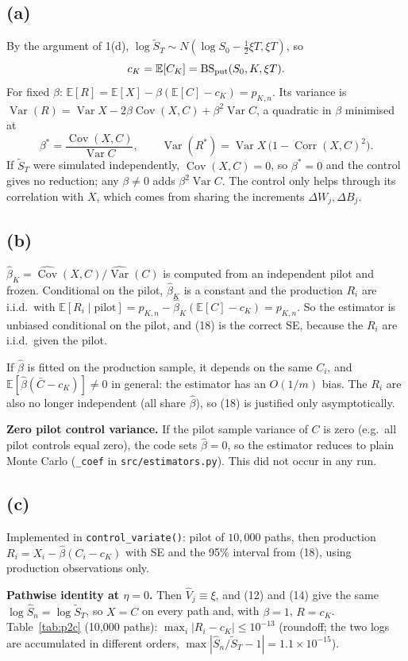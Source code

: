 \documentclass[10pt]{article}
\newcommand{\E}{\mathbb{E}}
\newcommand{\Var}{\operatorname{Var}}
\newcommand{\Cov}{\operatorname{Cov}}
\newcommand{\Corr}{\operatorname{Corr}}
\newcommand{\Vh}{\widehat V}
\newcommand{\Sh}{\widehat S}
\newcommand{\R}{../results}
\begin{document}
\subsection*{(a)}
By the argument of 1(d), $\log\widetilde S_T\sim N(\log S_0-\tfrac12\xi T,\xi T)$, so
\[
c_K=\E[C_K]=\mathrm{BS}_{\rm put}(S_0,K,\xi T).
\]
For fixed $\beta$: $\E[R]=\E[X]-\beta(\E[C]-c_K)=p_{K,n}$. Its variance is
$\Var(R)=\Var X-2\beta\Cov(X,C)+\beta^2\Var C$, a quadratic in $\beta$ minimised at
\[
\beta^*=\frac{\Cov(X,C)}{\Var C},\qquad \Var(R^*)=\Var X\,\big(1-\Corr(X,C)^2\big).
\]
If $\widetilde S_T$ were simulated independently, $\Cov(X,C)=0$, so $\beta^*=0$ and the control gives
no reduction; any $\beta\ne0$ adds $\beta^2\Var C$. The control only helps through its
correlation with $X$, which comes from sharing the increments $\Delta W_j,\Delta B_j$.

\subsection*{(b)}
$\hat\beta_K=\widehat{\Cov}(X,C)/\widehat{\Var}(C)$ is computed from an independent pilot and frozen.
Conditional on the pilot, $\hat\beta_K$ is a constant and the production $R_i$ are i.i.d.\ with
$\E[R_i\mid\text{pilot}]=p_{K,n}-\hat\beta_K(\E[C]-c_K)=p_{K,n}$. So the estimator is unbiased
conditional on the pilot, and (18) is the correct SE, because the $R_i$ are i.i.d.\ given the pilot.

If $\hat\beta$ is fitted on the production sample, it depends on the same $C_i$, and
$\E[\hat\beta(\bar C-c_K)]\neq0$ in general: the estimator has an $O(1/m)$ bias. The $R_i$ are also
no longer independent (all share $\hat\beta$), so (18) is justified only asymptotically.

\textbf{Zero pilot control variance.} If the pilot sample variance of $C$ is zero (e.g.\ all pilot
controls equal zero), the code sets $\hat\beta=0$, so the estimator reduces to plain Monte Carlo
(\texttt{\_coef} in \texttt{src/estimators.py}). This did not occur in any run.

\subsection*{(c)}
Implemented in \texttt{control\_variate()}: pilot of $10{,}000$ paths, then production
$R_i=X_i-\hat\beta(C_i-c_K)$ with SE and the 95\% interval from (18), using production observations only.

\textbf{Pathwise identity at $\eta=0$.} Then $\Vh_j\equiv\xi$, and (12) and (14) give the same
$\log\Sh_n=\log\widetilde S_T$, so $X=C$ on every path and, with $\beta=1$, $R=c_K$.
Table~\ref{tab:p2c} (10{,}000 paths): $\max_i|R_i-c_K|\le10^{-13}$ (roundoff; the two logs are
accumulated in different orders, $\max|\Sh_n/\widetilde S_T-1|=1.1\times10^{-15}$).
\begin{table}[H]\centering\small

\caption{$\eta=0$, $\beta=1$: adjusted payoffs are constant up to roundoff.}\label{tab:p2c}
\end{table}
\end{document}
